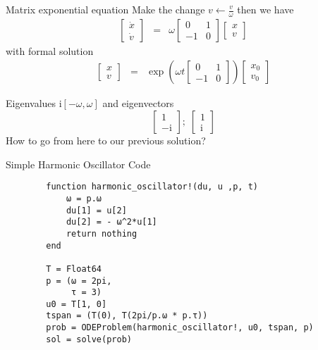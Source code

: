 \documentclass[aspectratio=169]{beamer}
\newcommand{\im}{\mathrm{i}} %
\begin{document}
\begin{frame}{Matrix exponential equation}
    Make the change $v \leftarrow \frac{v}{\omega}$ then we have
    \begin{eqnarray}
        \begin{bmatrix} \dot x \\ \dot v \end{bmatrix} & = & \omega \begin{bmatrix} 0 & 1 \\ -1 & 0 \end{bmatrix}  \begin{bmatrix} x \\ v \end{bmatrix} \nonumber
    \end{eqnarray}
    with formal solution
    \begin{eqnarray}
        \begin{bmatrix} x \\ v \end{bmatrix} & = & \exp\left(\omega t \begin{bmatrix} 0 & 1 \\ -1 & 0 \end{bmatrix}\right)  \begin{bmatrix} x_0 \\ v_0 \end{bmatrix} \nonumber
    \end{eqnarray}
    \pause

    Eigenvalues $\im[-\omega, \omega]$  and eigenvectors
    \begin{equation}
        \begin{bmatrix} 1 \\ -\im \end{bmatrix} ; \;  
        \begin{bmatrix} 1 \\ \im  \end{bmatrix} \nonumber 
    \end{equation}
    \pause
    How to go from here to our previous solution?
\end{frame}

\begin{frame}[fragile]{Simple Harmonic Oscillator Code}
    \begin{verbatim}
        function harmonic_oscillator!(du, u ,p, t)
            ω = p.ω
            du[1] = u[2]
            du[2] = - ω^2*u[1]
            return nothing
        end

        T = Float64
        p = (ω = 2pi, 
             τ = 3)
        u0 = T[1, 0]
        tspan = (T(0), T(2pi/p.ω * p.τ))
        prob = ODEProblem(harmonic_oscillator!, u0, tspan, p)
        sol = solve(prob)
    \end{verbatim}
\end{frame}
\end{document}
